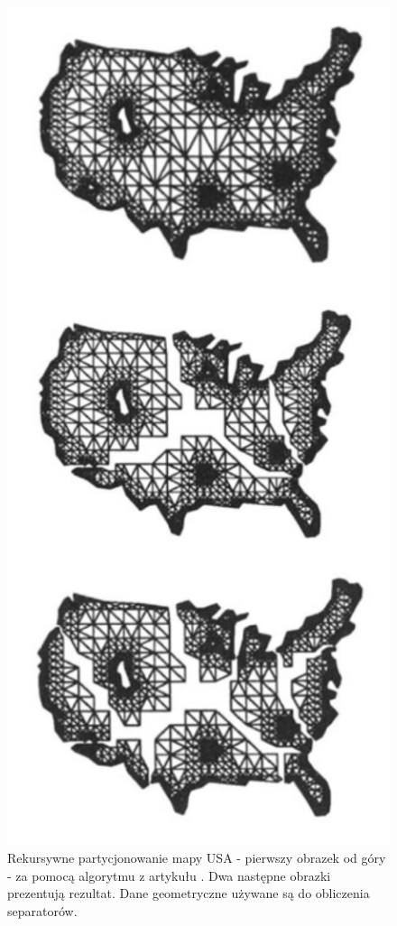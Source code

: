 \begin{figure}
    \includegraphics[width=\linewidth]{images/recursive-partitioning}
    \caption{Rekursywne partycjonowanie mapy USA - pierwszy obrazek od góry - za pomocą algorytmu z artykułu \cite{MiTeThVa93}.
    Dwa następne obrazki prezentują rezultat. Dane geometryczne używane są do obliczenia separatorów.}
\end{figure}


